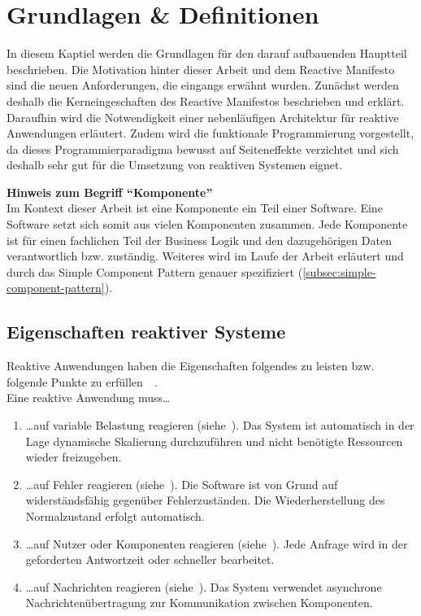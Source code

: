\chapter{Grundlagen \& Definitionen}
In diesem Kaptiel werden die Grundlagen für den darauf aufbauenden Hauptteil beschrieben. Die Motivation hinter dieser Arbeit und dem Reactive Manifesto sind die neuen Anforderungen, die eingangs erwähnt wurden. Zunächst werden deshalb die Kerneingeschaften des Reactive Manifestos beschrieben und erklärt. Daraufhin wird die Notwendigkeit einer nebenläufigen Architektur für reaktive Anwendungen erläutert. Zudem wird die funktionale Programmierung vorgestellt, da dieses Programmierparadigma bewusst auf Seiteneffekte verzichtet und sich deshalb sehr gut für die Umsetzung von reaktiven Systemen eignet.

\vspace{5cm}
\begin{framed}
\textbf{Hinweis zum Begriff \enquote{Komponente}}\\
Im Kontext dieser Arbeit ist eine Komponente ein Teil einer Software. Eine Software setzt sich somit aus vielen Komponenten zusammen. Jede Komponente ist für einen fachlichen Teil der Business Logik und den dazugehörigen Daten verantwortlich bzw. zuständig. Weiteres wird im Laufe der Arbeit erläutert und durch das Simple Component Pattern genauer spezifiziert (\ref{subsec:simple-component-pattern}).
\end{framed}

\pagebreak

\section{Eigenschaften reaktiver Systeme}
Reaktive Anwendungen haben die Eigenschaften folgendes zu leisten bzw. folgende Punkte zu erfüllen~\cite[S.~19ff]{kuhn_reactive_2015}~\cite[S.~6]{vernon_reactive_2016}.\\
Eine reaktive Anwendung muss\ldots
\begin{enumerate}
\item \ldots auf variable Belastung reagieren (siehe~). Das System ist automatisch in der Lage dynamische Skalierung durchzuführen und nicht benötigte Ressourcen wieder freizugeben.
\item \ldots auf Fehler reagieren (siehe~). Die Software ist von Grund auf widerständsfähig gegenüber Fehlerzuständen. Die Wiederherstellung des Normalzustand erfolgt automatisch.
\item \ldots auf Nutzer oder Komponenten reagieren (siehe~). Jede Anfrage wird in der geforderten Antwortzeit oder schneller bearbeitet.
\item \ldots auf Nachrichten reagieren (siehe~). Das System verwendet asynchrone Nachrichtenübertragung zur Kommunikation zwischen Komponenten.
\end{enumerate}

